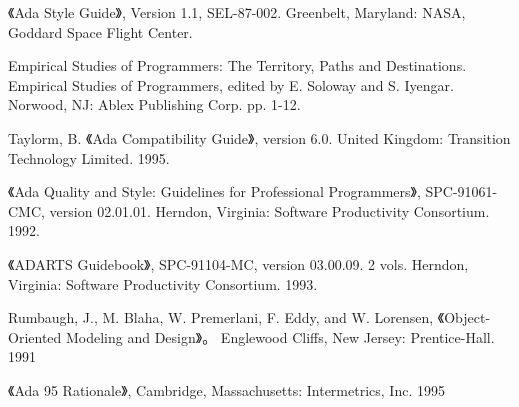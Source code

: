 \begin{thebibliography}{widest-label}
 《Ada Style Guide》, Version 1.1, SEL-87-002. Greenbelt, Maryland: NASA, Goddard Space Flight Center.

 Empirical Studies of Programmers:
The Territory, Paths and Destinations. Empirical Studies of Programmers, edited by E. Soloway and S. Iyengar. Norwood, NJ: Ablex Publishing Corp. pp. 1-12.

 Taylorm, B.
《Ada Compatibility Guide》, version 6.0. United Kingdom:
Transition Technology Limited. 1995.


 《Ada Quality and Style: Guidelines
for Professional Programmers》, SPC-91061-CMC, version 02.01.01.
Herndon, Virginia: Software Productivity Consortium. 1992.

 《ADARTS Guidebook》, SPC-91104-MC,
version 03.00.09. 2 vols. Herndon, Virginia: Software Productivity Consortium.
1993.

 Rumbaugh, J., M. Blaha, W. Premerlani, F. Eddy, and W. Lorensen, 《Object-Oriented Modeling and Design》。
Englewood Cliffs, New Jersey: Prentice-Hall. 1991

 《Ada 95 Rationale》, Cambridge,
Massachusetts: Intermetrics, Inc. 1995

\end{thebibliography}

